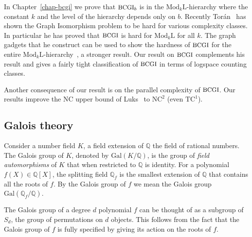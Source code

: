 \documentclass[11pt]{madras}%
\theoremstyle{remark}
\newcommand{\Gal}[1]{{\ensuremath{\mathrm{Gal}\left(#1\right)}}}
\newcommand{\ModkL}[1]{{\ensuremath{\mathrm{Mod}_{#1}\mathrm{L}}}}
\newcommand{\ProblemFont}[1]{{\ensuremath{\textrm{\small #1}}}}
\begin{document}
In Chapter~\ref{chap-bcgi} we prove that $\ProblemFont{BCGI}_b$ is in
the $\ModkL{k}$-hierarchy where the constant $k$ and the level of the
hierarchy depends only on $b$.  Recently
Tor\'an~\cite{toran2004hardness} has shown the Graph Isomorphism
problem to be hard for various complexity classes.  In particular he
has proved that $\ProblemFont{BCGI}$ is hard for $\ModkL{k}$ for all
$k$.  The graph gadgets that he construct can be used to show the
hardness of $\ProblemFont{BCGI}$ for the entire
$\ModkL{k}$-hierarchy~\cite[Appendix]{arvind2005bounded}, a stronger
result. Our result on $\ProblemFont{BCGI}$ complements his result and
gives a fairly tight classification of $\ProblemFont{BCGI}$ in terms
of logspace counting classes.

Another consequence of our result is on the parallel complexity of
$\ProblemFont{BCGI}$. Our results improve the $\mathrm{NC}$ upper
bound of Luks~\cite{luks86parallel} to $\mathrm{NC}^2$ (even
$\mathrm{TC}^1$).

\subsection*{Galois theory}

Consider a number field $K$, a field extension of $\mathbb{Q}$ the
field of rational numbers. The Galois group of $K$, denoted by
$\Gal{K/\mathbb{Q}}$, is the group of \emph{field automorphisms} of
$K$ that when restricted to $\mathbb{Q}$ is identity. For a polynomial
$f(X) \in \mathbb{Q}[X]$, the splitting field $\mathbb{Q}_f$ is the
smallest extension of $\mathbb{Q}$ that contains all the roots of $f$.
By the Galois group of $f$ we mean the Galois group
$\Gal{\mathbb{Q}_f/\mathbb{Q}}$.

The Galois group of a degree $d$ polynomial $f$ can be thought of as a
subgroup of $S_d$, the group of permutations on $d$ objects.  This
follows from the fact that the Galois group of $f$ is fully specified
by giving its action on the roots of $f$.

\end{document}
